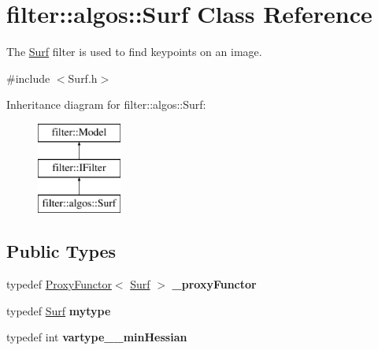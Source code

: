 \hypertarget{classfilter_1_1algos_1_1_surf}{}\section{filter\+:\+:algos\+:\+:Surf Class Reference}
\label{classfilter_1_1algos_1_1_surf}


The \hyperlink{classfilter_1_1algos_1_1_surf}{Surf} filter is used to find keypoints on an image.  




{\ttfamily \#include $<$Surf.\+h$>$}

Inheritance diagram for filter\+:\+:algos\+:\+:Surf\+:\begin{figure}[H]
\begin{center}
\leavevmode
\includegraphics[height=3.000000cm]{de/d14/classfilter_1_1algos_1_1_surf}
\end{center}
\end{figure}
\subsection*{Public Types}
\begin{DoxyCompactItemize}
\item 
\mbox{\label{classfilter_1_1algos_1_1_surf_a0f5a924783ec0c7870cda4f0c5a9d7ee}} 
typedef \hyperlink{class_proxy_functor}{Proxy\+Functor}$<$ \hyperlink{classfilter_1_1algos_1_1_surf}{Surf} $>$ {\bfseries \+\_\+proxy\+Functor}
\item 
\mbox{\label{classfilter_1_1algos_1_1_surf_af88d72627fd609eb1355c59b871fcce1}} 
typedef \hyperlink{classfilter_1_1algos_1_1_surf}{Surf} {\bfseries mytype}
\item 
\mbox{\label{classfilter_1_1algos_1_1_surf_a8df2e94b32a396ccde0710ee01ad6bfc}} 
typedef int {\bfseries vartype\+\_\+\+\_\+min\+Hessian}
\end{DoxyCompactItemize}
